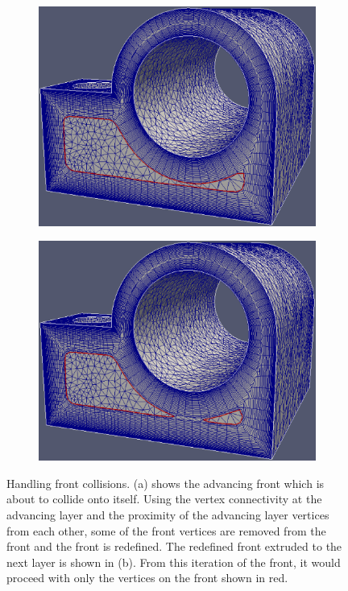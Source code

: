 \begin{figure}[!hbt]
\centering
\begin{subfigure}{.5\textwidth}
  \centering
  \includegraphics[width=.9\linewidth]{img/m2/meshCases/joint-x0.004-g1.04-a5/collapse1.eps}
  \caption{}
  \label{fig-collision1}
\end{subfigure}%
\begin{subfigure}{.5\textwidth}
  \centering
  \includegraphics[width=.9\linewidth]{img/m2/meshCases/joint-x0.004-g1.04-a5/collapse2.eps}
  \caption{}
  \label{fig-collision2}
\end{subfigure}
\caption{Handling front collisions. (a) shows the advancing front which is about to collide onto itself. Using the vertex connectivity at the advancing layer and the proximity of the advancing layer vertices from each other, some of the front vertices are removed from the front and the front is redefined. The redefined front extruded to the next layer is shown in (b). From this iteration of the front, it would proceed with only the vertices on the front shown in red.}
\label{fig-collision}
\end{figure}

